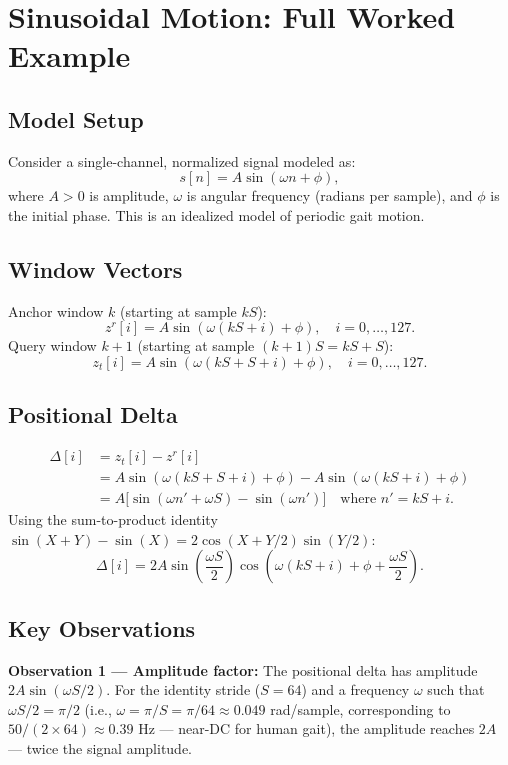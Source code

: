 \documentclass[11pt, a4paper]{article}
\theoremstyle{definition}
\theoremstyle{plain}
\begin{document}
\section{Sinusoidal Motion: Full Worked Example}

\subsection{Model Setup}

Consider a single-channel, normalized signal modeled as:
\[
  s[n] = A \sin(\omega n + \phi),
\]
where $A > 0$ is amplitude, $\omega$ is angular frequency (radians per sample),
and $\phi$ is the initial phase. This is an idealized model of periodic gait motion.

\subsection{Window Vectors}

Anchor window $k$ (starting at sample $kS$):
\[
  z^r[i] = A \sin(\omega(kS + i) + \phi), \quad i = 0, \ldots, 127.
\]
Query window $k+1$ (starting at sample $(k+1)S = kS + S$):
\[
  z_t[i] = A \sin(\omega(kS + S + i) + \phi), \quad i = 0, \ldots, 127.
\]

\subsection{Positional Delta}

\begin{align}
  \Delta[i] &= z_t[i] - z^r[i] \\
  &= A \sin(\omega(kS + S + i) + \phi) - A \sin(\omega(kS + i) + \phi) \\
  &= A \bigl[\sin(\omega n' + \omega S) - \sin(\omega n')\bigr]
  \quad \text{where } n' = kS + i.
\end{align}
Using the sum-to-product identity $\sin(X + Y) - \sin(X) = 2\cos(X + Y/2)\sin(Y/2)$:
\begin{equation}\label{eq:sinusoidal_delta}
  \Delta[i] = 2A \sin\!\left(\frac{\omega S}{2}\right)
              \cos\!\left(\omega(kS + i) + \phi + \frac{\omega S}{2}\right).
\end{equation}

\subsection{Key Observations}

\textbf{Observation 1 — Amplitude factor:}
The positional delta has amplitude $2A\sin(\omega S / 2)$.
For the identity stride ($S = 64$) and a frequency $\omega$ such that
$\omega S / 2 = \pi/2$ (i.e., $\omega = \pi/S = \pi/64 \approx 0.049$ rad/sample,
corresponding to $50 / (2 \times 64) \approx 0.39$ Hz — near-DC for human gait),
the amplitude reaches $2A$ — twice the signal amplitude.
\end{document}
